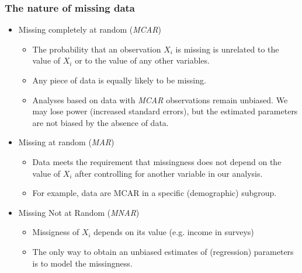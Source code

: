 \documentclass{beamer}
\begin{document}
\begin{frame}
\frametitle{The nature of missing data}

\begin{itemize}
  \item[] Missing completely at random (\textit{MCAR})
  \begin{itemize}
  \item The probability that an observation $X_i$ is missing is unrelated to the value of $X_i$ or to the value of any other variables.
  \item Any piece of data is equally likely to be missing.
  \item Analyses based on data with \textit{MCAR} observations remain unbiased. We may lose power (increased standard errors), but the estimated parameters are not biased by the absence of data.
  \end{itemize}
  \vspace{0.2cm}
  \item[] Missing at random (\textit{MAR})
  \begin{itemize}
  \item Data meets the requirement that missingness does not depend on the value of $X_i$ after controlling for another variable in our analysis.
  \item For example, data are MCAR in a specific (demographic) subgroup. 
  \end{itemize}
  \vspace{0.2cm}
  \item[] Missing Not at Random (\textit{MNAR})
  \begin{itemize}
  \item Missigness of $X_i$ depends on its value (e.g. income in surveys)
  \item The only way to obtain an unbiased estimates of (regression) parameters is to model the missingness.
  \end{itemize}
\end{itemize}


\end{frame}

\end{document}
